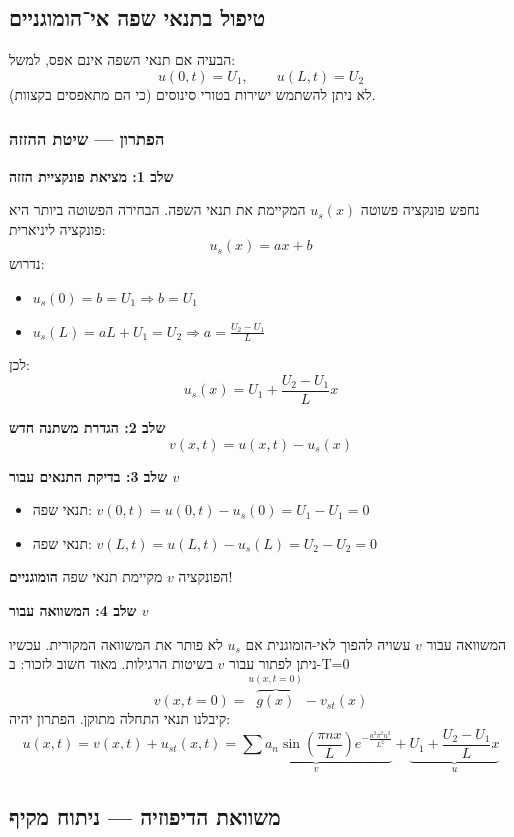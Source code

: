 \subsection{טיפול בתנאי שפה אי־הומוגניים}

\begin{problembox}{הבעיה}
אם תנאי השפה אינם אפס, למשל:
\[
u(0,t)=U_1, \qquad u(L,t)=U_2
\]
לא ניתן להשתמש ישירות בטורי סינוסים (כי הם מתאפסים בקצוות).
\end{problembox}

\subsubsection{הפתרון — שיטת ההזזה}

\textbf{שלב 1: מציאת פונקציית הזזה}

נחפש פונקציה פשוטה $u_s(x)$ המקיימת את תנאי השפה. הבחירה הפשוטה ביותר היא פונקציה ליניארית:
\[
u_s(x) = ax + b
\]
נדרוש:
\begin{itemize}
    \item $u_s(0) = b = U_1 \Rightarrow b = U_1$
    \item $u_s(L) = aL + U_1 = U_2 \Rightarrow a = \frac{U_2 - U_1}{L}$
\end{itemize}
לכן:
\[
\boxed{u_s(x) = U_1 + \frac{U_2 - U_1}{L}x}
\]

\textbf{שלב 2: הגדרת משתנה חדש}
\[
v(x,t) = u(x,t) - u_s(x)
\]

\textbf{שלב 3: בדיקת התנאים עבור $v$}
\begin{itemize}
    \item תנאי שפה: $v(0,t) = u(0,t) - u_s(0) = U_1 - U_1 = 0$ \checkmark
    \item תנאי שפה: $v(L,t) = u(L,t) - u_s(L) = U_2 - U_2 = 0$ \checkmark
\end{itemize}
הפונקציה $v$ מקיימת תנאי שפה \textbf{הומוגניים}!

\textbf{שלב 4: המשוואה עבור $v$}

המשוואה עבור $v$ עשויה להפוך לאי-הומוגנית אם $u_s$ לא פותר את המשוואה המקורית. עכשיו ניתן לפתור עבור $v$ בשיטות הרגילות.
מאוד חשוב לזכור:
ב-T=0
\[v(x,t=0)=\overbrace{g(x)}^{u(x,t=0)}-v_{st}(x)\]
קיבלנו תנאי התחלה מתוקן.
הפתרון יהיה:
\[u(x,t)=v(x,t)+u_{st}(x,t)=\underbrace{\sum a_n \sin(\frac{\pi nx}{L}) e^{-\frac{a^2 \pi^2 n^2}{L^2}}}_v+\underbrace{U_1 + \frac{U_2 - U_1}{L}x}_u \]


\subsection{משוואת הדיפוזיה — ניתוח מקיף}

